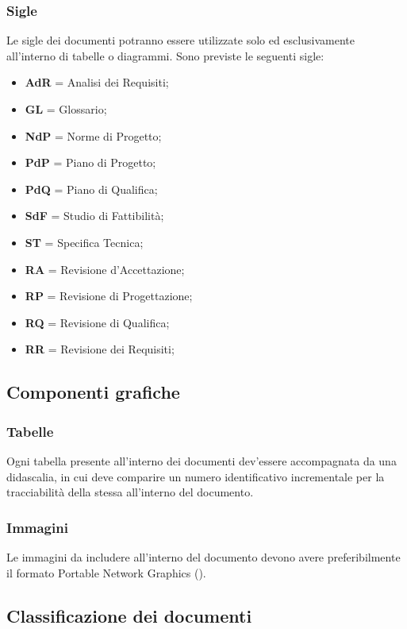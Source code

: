      \subsubsection{Sigle}
        Le sigle dei documenti potranno essere utilizzate solo ed esclusivamente all'interno di tabelle o diagrammi. Sono previste le seguenti sigle:
        \begin{itemize}
          \item \textbf{AdR} = Analisi dei Requisiti;
          \item \textbf{GL} = Glossario;
          \item \textbf{NdP} = Norme di Progetto;
          \item \textbf{PdP} = Piano di Progetto;
          \item \textbf{PdQ} = Piano di Qualifica;
          \item \textbf{SdF} = Studio di Fattibilità;
          \item \textbf{ST} = Specifica Tecnica;
          \item \textbf{RA} = Revisione d'Accettazione;
          \item \textbf{RP} = Revisione di Progettazione;
          \item \textbf{RQ} = Revisione di Qualifica;
          \item \textbf{RR} = Revisione dei Requisiti;
        \end{itemize}
    \subsection{Componenti grafiche}
      \subsubsection{Tabelle}
        Ogni tabella presente all’interno dei documenti dev’essere accompagnata da una didascalia, in cui deve comparire un numero identificativo incrementale per la tracciabilità
        della stessa all’interno del documento.
      \subsubsection{Immagini}
        Le immagini da includere all'interno del documento devono avere preferibilmente il formato Portable Network Graphics ().
    \subsection{Classificazione dei documenti}
